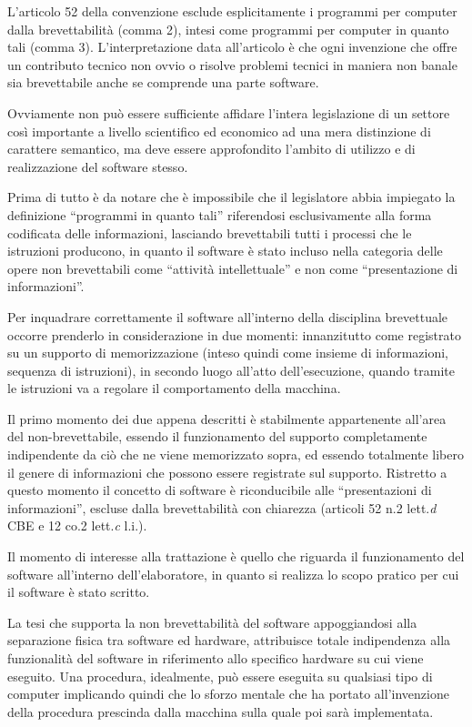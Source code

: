 L'articolo 52  della convenzione esclude esplicitamente i programmi per computer dalla brevettabilità (comma 2), intesi come programmi per computer in quanto tali (comma 3). L'interpretazione data all'articolo è che ogni invenzione che offre un contributo tecnico non ovvio o risolve problemi tecnici in maniera non banale sia brevettabile anche se comprende una parte software.

Ovviamente non può essere sufficiente affidare l'intera legislazione di un settore così importante a livello scientifico ed economico ad una mera distinzione di carattere semantico, ma deve essere approfondito l'ambito di utilizzo e di realizzazione del software stesso.

Prima di tutto è da notare che è impossibile che il legislatore abbia impiegato la definizione ``programmi in quanto tali'' riferendosi esclusivamente alla forma codificata delle informazioni, lasciando brevettabili tutti i processi che le istruzioni producono, in quanto il software è stato incluso nella categoria delle opere non brevettabili come ``attività intellettuale'' e non come ``presentazione di informazioni''.

Per inquadrare correttamente il software all'interno della disciplina brevettuale occorre prenderlo in considerazione in due momenti: innanzitutto come registrato su un supporto di memorizzazione (inteso quindi come insieme di informazioni, sequenza di istruzioni), in secondo luogo all'atto dell'esecuzione, quando tramite le istruzioni va a regolare il comportamento della macchina.

Il primo momento dei due appena descritti è stabilmente appartenente all'area del non-brevettabile, essendo il funzionamento del supporto completamente indipendente da ciò che ne viene memorizzato sopra, ed essendo totalmente libero il genere di informazioni che possono essere registrate sul supporto. Ristretto a questo momento il concetto di software è riconducibile alle ``presentazioni di informazioni'', escluse dalla brevettabilità con chiarezza (articoli 52 n.2 lett.\textit{d} CBE e 12 co.2 lett.\textit{c} l.i.).

Il momento di interesse alla trattazione è quello che riguarda il funzionamento del software all'interno dell'elaboratore, in quanto si realizza lo scopo pratico per cui il software è stato scritto.

La tesi che supporta la non brevettabilità del software appoggiandosi alla separazione fisica tra software ed hardware, attribuisce totale indipendenza alla funzionalità del software in riferimento allo specifico hardware su cui viene eseguito. Una procedura, idealmente, può essere eseguita su qualsiasi tipo di computer implicando quindi che lo sforzo mentale che ha portato all'invenzione della procedura prescinda dalla macchina sulla quale poi sarà implementata.

